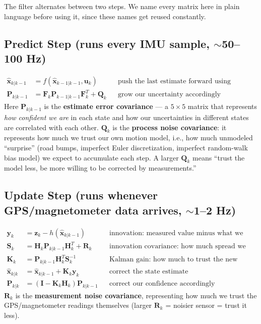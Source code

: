 \documentclass[11pt,a4paper]{article}
\begin{document}
The filter alternates between two steps. We name every matrix here in plain language before using it, since these names get reused constantly.

\subsection{Predict Step (runs every IMU sample, $\sim$50--100 Hz)}
\begin{align}
    \hat{\mathbf{x}}_{k|k-1} &= f(\hat{\mathbf{x}}_{k-1|k-1}, \mathbf{u}_k) &&\text{push the last estimate forward using Section 3.2's equations} \\
    \mathbf{P}_{k|k-1} &= \mathbf{F}_k \mathbf{P}_{k-1|k-1} \mathbf{F}_k^T + \mathbf{Q}_k &&\text{grow our uncertainty accordingly}
\end{align}
Here $\mathbf{P}_{k|k-1}$ is the \textbf{estimate error covariance} --- a $5\times5$ matrix that represents \emph{how confident we are} in each state and how our uncertainties in different states are correlated with each other. $\mathbf{Q}_k$ is the \textbf{process noise covariance}: it represents how much we trust our own motion model, i.e., how much unmodeled ``surprise'' (road bumps, imperfect Euler discretization, imperfect random-walk bias model) we expect to accumulate each step. A larger $\mathbf{Q}_k$ means ``trust the model less, be more willing to be corrected by measurements.''

\subsection{Update Step (runs whenever GPS/magnetometer data arrives, $\sim$1--2 Hz)}
\begin{align}
    \mathbf{y}_k &= \mathbf{z}_k - h(\hat{\mathbf{x}}_{k|k-1}) &&\text{innovation: measured value minus what we expected to measure} \\
    \mathbf{S}_k &= \mathbf{H}_k \mathbf{P}_{k|k-1} \mathbf{H}_k^T + \mathbf{R}_k &&\text{innovation covariance: how much spread we expect in that mismatch} \\
    \mathbf{K}_k &= \mathbf{P}_{k|k-1} \mathbf{H}_k^T \mathbf{S}_k^{-1} &&\text{Kalman gain: how much to trust the new measurement vs. our prediction} \\
    \hat{\mathbf{x}}_{k|k} &= \hat{\mathbf{x}}_{k|k-1} + \mathbf{K}_k \mathbf{y}_k &&\text{correct the state estimate} \\
    \mathbf{P}_{k|k} &= (\mathbf{I} - \mathbf{K}_k \mathbf{H}_k)\mathbf{P}_{k|k-1} &&\text{correct our confidence accordingly}
\end{align}
$\mathbf{R}_k$ is the \textbf{measurement noise covariance}, representing how much we trust the GPS/magnetometer readings themselves (larger $\mathbf{R}_k$ = noisier sensor = trust it less).
\end{document}
